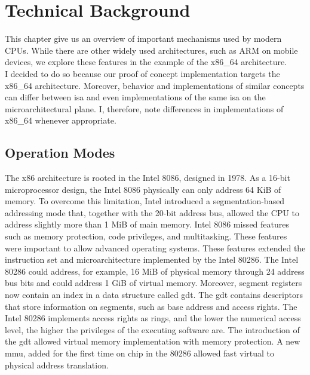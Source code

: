 \section{Technical Background}
\label{sec:state:technical}
This chapter give us an overview of important mechanisms used by modern CPUs.
While there are other widely used architectures, such as ARM on mobile devices,
we explore these features in the example of the x86\_64 architecture. \\

I decided to do so because our proof of concept implementation targets the
x86\_64 architecture. Moreover, behavior and implementations of similar concepts
can differ between \gls{isa} and even implementations of the
same \gls{isa} on the microarchitectural plane. I, therefore, note
differences in implementations of x86\_64 whenever appropriate.

\subsection{Operation Modes}
\label{sec:state:technical:modes}
The x86 architecture is rooted in the Intel 8086, designed in 1978. As a 16-bit
microprocessor design, the Intel 8086 physically can only address 64 KiB of
memory. To overcome this limitation, Intel introduced a segmentation-based
addressing mode that, together with the 20-bit address bus, allowed the CPU to
address slightly more than 1 MiB of main memory. Intel 8086 missed features such
as memory protection, code privileges, and multitasking. These features were
important to allow advanced operating systems. These features extended the
instruction set and microarchitecture implemented by the Intel 80286. The Intel
80286 could address, for example, 16 MiB of physical memory through 24 address
bus bits and could address 1 GiB of virtual memory. Moreover, segment registers
now contain an index in a data structure called \gls{gdt}. The \gls{gdt}
contains descriptors that store information on segments, such as base address
and access rights. The Intel 80286 implements access rights as rings, and the
lower the numerical access level, the higher the privileges of the executing
software are. The introduction of the \gls{gdt} allowed virtual memory
implementation with memory protection. A new \gls{mmu}, added for the first time
on chip in the 80286 allowed fast virtual to physical address translation. \\

